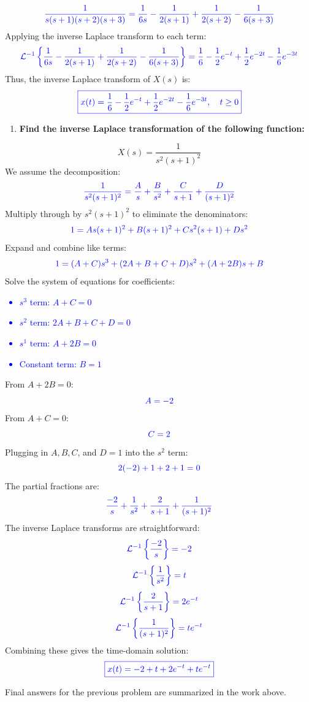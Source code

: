 \documentclass[12pt]{article}
\begin{document}
\[
	\textcolor{blue}{\frac{1}{s(s+1)(s+2)(s+3)} = \frac{1}{6s} - \frac{1}{2(s+1)} + \frac{1}{2(s+2)} - \frac{1}{6(s+3)}}
\]
Applying the inverse Laplace transform to each term:
\[
	\textcolor{blue}{\mathcal{L}^{-1}\left\{\frac{1}{6s} - \frac{1}{2(s+1)} + \frac{1}{2(s+2)} - \frac{1}{6(s+3)}\right\} = \frac{1}{6} - \frac{1}{2}e^{-t} + \frac{1}{2}e^{-2t} - \frac{1}{6}e^{-3t}}
\]
Thus, the inverse Laplace transform of \( X(s) \) is:
\[
	\textcolor{blue}{\boxed{x(t) = \frac{1}{6} - \frac{1}{2}e^{-t} + \frac{1}{2}e^{-2t} - \frac{1}{6}e^{-3t}, \quad t \geq 0}}
\]
\newpage
\begin{enumerate}
	\item[(b)] \textbf{Find the inverse Laplace transformation of the following function:}
\end{enumerate}
\[
	X(s) = \frac{1}{s^2(s+1)^2}
\]
We assume the decomposition:
\[
	\textcolor{blue}{\frac{1}{s^2 (s + 1)^2} = \frac{A}{s} + \frac{B}{s^2} + \frac{C}{s+1} + \frac{D}{(s+1)^2}}
\]
Multiply through by \(s^2 (s + 1)^2\) to eliminate the denominators:
\[
	\textcolor{blue}{1 = A s (s + 1)^2 + B (s + 1)^2 + C s^2 (s + 1) + D s^2}
\]
Expand and combine like terms:
\[
	\textcolor{blue}{1 = (A + C)s^3 + (2A + B + C + D)s^2 + (A + 2B)s + B}
\]
Solve the system of equations for coefficients:
\textcolor{blue}{\begin{itemize}
	\item \(s^3\) term: \(A + C = 0\)
	\item \(s^2\) term: \(2A + B + C + D = 0\)
	\item \(s^1\) term: \(A + 2B = 0\)
	\item Constant term: \(B = 1\)
	\end{itemize}}
From \(A + 2B = 0\):
\[
	\textcolor{blue}{A = -2}
\]
From \(A + C = 0\):
\[
	\textcolor{blue}{C = 2}
\]
Plugging in \(A, B, C\), and \(D = 1\) into the \(s^2\) term:
\[
	\textcolor{blue}{2(-2) + 1 + 2 + 1 = 0}
\]
The partial fractions are:
\[
	\textcolor{blue}{\frac{-2}{s} + \frac{1}{s^2} + \frac{2}{s+1} + \frac{1}{(s+1)^2}}
\]
The inverse Laplace transforms are straightforward:
\[
	\textcolor{blue}{\mathcal{L}^{-1}\left\{\frac{-2}{s}\right\} = -2}
\]
\[
	\textcolor{blue}{\mathcal{L}^{-1}\left\{\frac{1}{s^2}\right\} = t}
\]
\[
	\textcolor{blue}{\mathcal{L}^{-1}\left\{\frac{2}{s+1}\right\} = 2e^{-t}}
\]
\[
	\textcolor{blue}{\mathcal{L}^{-1}\left\{\frac{1}{(s+1)^2}\right\} = te^{-t}}
\]
Combining these gives the time-domain solution:
\[
	\textcolor{blue}{\boxed{x(t) = -2 + t + 2e^{-t} + te^{-t}}}
\]
\newpage
\begin{resultsbox}
Final answers for the previous problem are summarized in the work above.
\end{resultsbox}
\end{document}
